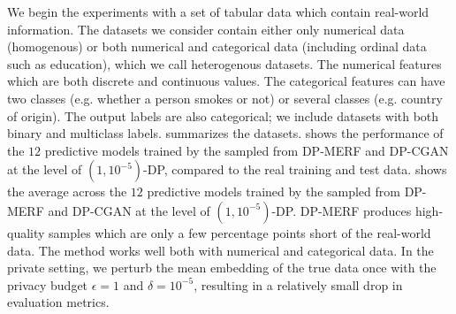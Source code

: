 \documentclass{article}
\begin{document}



We begin the experiments with a set of tabular data which contain real-world information. 
The datasets we consider contain either only numerical data (homogenous) or both numerical and categorical data (including ordinal data such as education), which we call heterogenous datasets.
%
The numerical features which are both discrete and continuous values.  The categorical features can have two classes (e.g. whether a person smokes or not) or several classes (e.g. country of origin). The output labels are also categorical;  we include datasets with both binary and multiclass labels.  summarizes the datasets.
%
%
%
 shows the performance of the $12$ predictive models trained by the sampled from DP-MERF and DP-CGAN at the level of $(1, 10^{-5})$-DP, compared to the real training and test data.  shows the average across the $12$ predictive models trained by the sampled from DP-MERF and DP-CGAN at the level of $(1, 10^{-5})$-DP.
%
DP-MERF produces high-quality samples which are only a few percentage points short of the real-world data. The method works well both with numerical and categorical data. In the private setting, we perturb the mean embedding of the true data once with the privacy budget $\epsilon=1$ and $\delta=10^{-5}$, resulting in a relatively small drop in evaluation metrics. 
 
\end{document}
